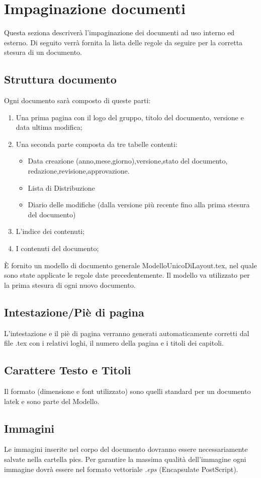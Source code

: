 \documentclass[11pt,titlepage,a4paper]{report}
\begin{document}
\section{Impaginazione documenti}
Questa seziona descriver\`a l'impaginazione dei documenti ad uso interno ed esterno. Di seguito verr\`a fornita la lista delle regole da seguire per la corretta stesura di un documento.
\subsection{Struttura documento}
Ogni documento sar\`a composto di queste parti:
\begin{enumerate}
\item Una prima pagina con il logo del gruppo, titolo del documento, versione e data ultima modifica;
\item Una seconda parte composta da tre tabelle contenti:
	{\begin{itemize}
	\item Data creazione (anno,mese,giorno),versione,stato del documento, redazione,revisione,approvazione.
	\item Lista di Distribuzione
	\item Diario delle modifiche (dalla versione pi\`u recente fino alla prima stesura del documento)
	\end{itemize}}
\item L'indice dei contenuti;
\item I contenuti del documento;
\end{enumerate}
\`E fornito un modello di documento generale ModelloUnicoDiLayout.tex, nel quale sono state applicate le regole date precedentemente. Il modello va utilizzato per la prima stesura di ogni nuovo documento.
\subsection{Intestazione/Pi\`e di pagina}
L'intestazione e il pi\`e di pagina verranno generati automaticamente corretti dal file .tex con i relativi loghi, il numero della pagina e i titoli dei capitoli.
\subsection{Carattere Testo e Titoli}
Il formato (dimensione e font utilizzato) sono quelli standard per un documento latek e sono parte del Modello.
\subsection{Immagini}
Le immagini inserite nel corpo del documento dovranno essere necessariamente salvate nella cartella pics. Per garantire la massima qualit\`a dell'immagine ogni immagine dovr\`a essere nel formato vettoriale \textit{.eps} (Encapsulate PostScript).
\end{document}
